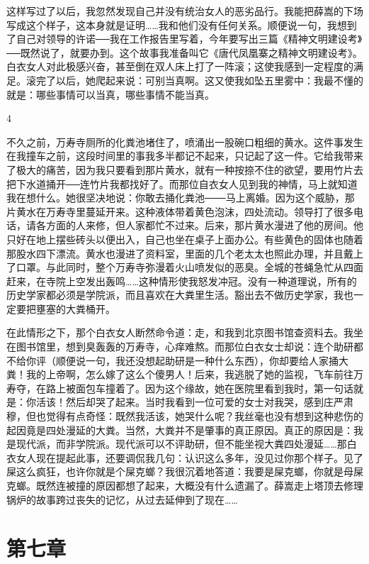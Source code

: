这样写过了以后，我忽然发现自己并没有统治女人的恶劣品行。我能把薛嵩的下场写成这个样子，这本身就是证明……我和他们没有任何关系。顺便说一句，我想到了自己对领导的许诺──我在工作报告里写着，今年要写出三篇《精神文明建设考》──既然说了，就要办到。这个故事我准备叫它《唐代凤凰寨之精神文明建设考》。白衣女人对此极感兴奋，甚至倒在双人床上打了一阵滚；这使我感到一定程度的满足。滚完了以后，她爬起来说：可别当真啊。这又使我如坠五里雾中：我最不懂的就是：哪些事情可以当真，哪些事情不能当真。 

4 

不久之前，万寿寺厕所的化粪池堵住了，喷涌出一股碗口粗细的黄水。这件事发生在我撞车之前，这段时间里的事我多半都记不起来，只记起了这一件。它给我带来了极大的痛苦，因为我只要看到那片黄水，就有一种按捺不住的欲望，要用竹片去把下水道捅开──连竹片我都找好了。而那位自衣女人见到我的神情，马上就知道我在想什么。她很坚决地说：你敢去捅化粪池───马上离婚。因为这个威胁，那片黄水在万寿寺里蔓延开来。这种液体带着黄色泡沫，四处流动。领导打了很多电话，请各方面的人来修，但人家都忙不过来。后来，那片黄水漫进了他的房间。他只好在地上摆些砖头以便出入，自己也坐在桌子上面办公。有些黄色的固体也随着那股水四下漂流。黄水也漫进了资料室，里面的几个老太太也照此办理，并且戴上了口罩。与此同时，整个万寿寺弥漫着火山喷发似的恶臭。全城的苍蝇急忙从四面赶来，在寺院上空发出轰鸣……这种情形使我怒发冲冠。没有一种道理说，所有的历史学家都必须是学院派，而且喜欢在大粪里生活。豁出去不做历史学家，我也一定要把壅塞的大粪桶开。 

在此情形之下，那个白衣女人断然命令道：走，和我到北京图书馆查资料去。我坐在图书馆里，想到臭轰轰的万寿寺，心痒难熬。而那位白衣女士却说：连个助研都不给你评（顺便说一句，我还没想起助研是一种什么东西），你却要给人家捅大粪！我的上帝啊，怎么嫁了这么个傻男人！后来，我逃脱了她的监视，飞车前往万寿夺，在路上被面包车撞着了。因为这个缘故，她在医院里看到我时，第一句话就是：你活该！然后却哭了起来。当时我看到一位可爱的女士对我哭，感到庄严肃穆，但也觉得有点奇怪：既然我活该，她哭什么呢？我丝毫也没有想到这种悲伤的起因竟是四处漫延的大粪。当然，大粪并不是肇事的真正原因。真正的原因是：我是现代派，而非学院派。现代派可以不评助研，但不能坐视大粪四处漫延……那白衣女人现在提起此事，还要调侃我几句：认识这么多年，没见过你那个样子。见了屎这么疯狂，也许你就是个屎克螂？我很沉着地答道：我要是屎克螂，你就是母屎克螂。既然连被撞的原因都想了起来，大概没有什么遗漏了。薛嵩走上塔顶去修理锅炉的故事跨过丧失的记忆，从过去延伸到了现在……

\section{第七章}

